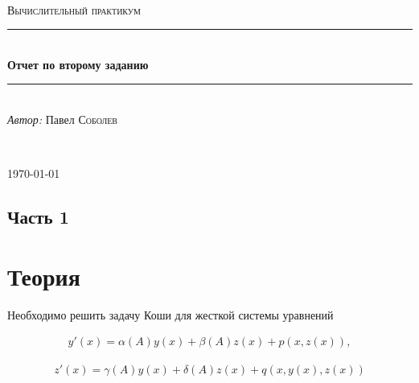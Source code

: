 

\usepackage{graphicx}



\begin{titlepage}

    \newcommand{\HRule}{\rule{\linewidth}{0.5mm}}

    \center

    \ \\[6.5cm]

    \textsc{\Large Вычислительный практикум}\\[0.5cm]

    \HRule\\[0.4cm]

    {\huge\bfseries Отчет по второму заданию}\\[0.4cm]

    \HRule\\[0.5cm]

    \large
    \textit{Автор:} Павел \textsc{Соболев}

    \ \\[0.9cm]
    \vfill\vfill\vfill

    {\large\today}

    \vfill

\end{titlepage}

\subsection*{Часть 1}
\section*{Теория}

\vspace{18pt}

Необходимо решить задачу Коши для жесткой системы уравнений

\hs
\begin{gather}
     y'(x) = \alpha(A) y(x) + \beta(A) z(x) + p(x, z(x)),
\end{gather}

\begin{gather}
     z'(x) = \gamma(A) y(x) + \delta(A) z(x) + q(x, y(x), z(x))
\end{gather}

